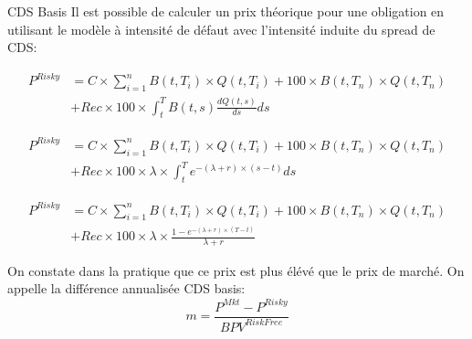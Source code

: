 \documentclass{beamer}
\begin{document}
\begin{frame}{CDS Basis}
Il est possible de calculer un prix théorique pour une obligation en utilisant le modèle à intensité de défaut avec l'intensité induite du spread de CDS:\\
\begin{overprint}
\begin{align*}
P^{Risky}&=C \times \sum_{i=1}^{n} B(t,T_i) \times Q(t,T_i) + 100 \times B(t,T_n) \times Q(t,T_n)\\
&+Rec \times 100 \times \int_{t}^{T} B(t,s) \frac{dQ(t,s)}{ds}ds
\end{align*}

\begin{align*}
P^{Risky}&=C \times \sum_{i=1}^{n} B(t,T_i) \times Q(t,T_i) + 100 \times B(t,T_n) \times Q(t,T_n)\\
&+Rec\times 100 \times \lambda \times \int_{t}^{T} e^{-(\lambda+r) \times (s-t)}ds
\end{align*}

\begin{align*}
P^{Risky}&=C \times \sum_{i=1}^{n} B(t,T_i) \times Q(t,T_i) + 100 \times B(t,T_n) \times Q(t,T_n)\\
&+Rec \times 100 \times \lambda \times\frac{ 1-e^{-(\lambda+r) \times (T-t)}}{\lambda+r}
\end{align*}
\end{overprint}
 On constate dans la pratique que ce prix est plus élévé que le prix de marché. On appelle la différence annualisée CDS basis:\\ 
\[
m=\frac{P^{Mkt}-P^{Risky}}{BPV^{Risk Free}}
\]
\end{frame}
\end{document}
